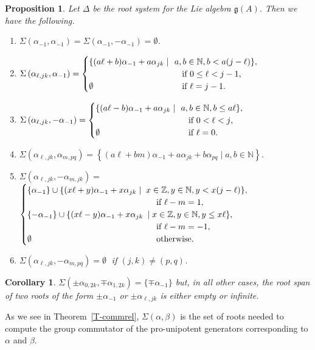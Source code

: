 \documentclass[11pt,letterpaper]{amsart}
\newcounter{thecounter}
\numberwithin{thecounter}{section}
\newtheorem{proposition}[thecounter]{Proposition}
\newtheorem{corollary}[thecounter]{Corollary}
\theoremstyle{definition}
\renewcommand{\a}{\alpha}
\renewcommand{\b}{\beta}
\newcommand{\Z}{{\mathbb Z}}
\newcommand{\N}{{\mathbb N}}
\begin{document}
\begin{proposition}\label{P-Sigma}
 Let $\Delta$ be the root system for the Lie algebra $\mathfrak{g}(A)$. Then we have the following.
\begin{enumerate}
\item $\displaystyle  \Sigma\left(\a_{-1},\a_{-1} \right)= \Sigma\left(\a_{-1},-\a_{-1} \right)=\emptyset$.
\item $\displaystyle  \Sigma\left(\a_{\ell,jk},\a_{-1} \right) = \begin{cases} 
 \{(a\ell+b)\a_{-1} + a\a_{jk} \mid&\!\! a,b\in\N, b<a(j-\ell)\}, \\
  &\text{\;\;if $0\le\ell<j-1$,}\\ 
  \emptyset&\text{\;\;if $\ell=j-1$.}\end{cases}$
\item $\displaystyle  \Sigma\left(\a_{\ell,jk},-\a_{-1} \right) = \begin{cases} 
 \{(a\ell-b)\a_{-1} + a\a_{jk} \mid&\!\! a,b\in\N, b\le a\ell\},\\ &\text{\;\;if $0<\ell<j$,}\\ 
  \emptyset&\text{\;\;if $\ell=0$.}\end{cases}$
\item $\displaystyle \Sigma\left(\a_{\ell,jk},\a_{m,pq} \right) =\left\{(a\ell+bm)\a_{-1}+a\a_{jk}+b\a_{pq} \mid a,b\in\N \right\}$.
\item $\displaystyle \Sigma\left(\a_{\ell,jk}, -\a_{m,jk} \right) =$ \\  $\begin{cases} 
 \{\a_{-1}\}\cup\{(x\ell+y)\a_{-1} + x\a_{jk}\mid &\!\!\!\! x\in\Z, y\in\N, y<x(j-\ell)\},\\ & \text{\;\;if $\ell-m=1$},\\ 
 \{-\a_{-1}\}\cup\{(x\ell-y)\a_{-1} + x\a_{jk}&\!\!\!\mid x\in\Z, y\in\N, y\le x\ell\},\\& \text{\;\;if $\ell-m=-1$},\\
  \emptyset & \text{\;\;otherwise.} \end{cases}$
\item  $\displaystyle \Sigma\left(\a_{\ell,jk}, -\a_{m,pq} \right)=\emptyset\;$ if $(j,k)\ne(p,q)$.
\end{enumerate}
\end{proposition}
\begin{corollary}\label{C-Sigma}
$\Sigma(\pm\a_{0,2k},\mp\a_{1,2k})=\{\mp\a_{-1}\}
$
but, in all other cases,
the root span of two roots of the form $\pm\a_{-1}$ or $\pm\a_{\ell,jk}$ is either empty or infinite.
\end{corollary}
As we see in Theorem~\ref{T-commrel}, $\Sigma(\a,\b)$ is the set of roots needed to compute the group commutator of the pro-unipotent generators corresponding to $\a$ and $\b$.
\end{document}
